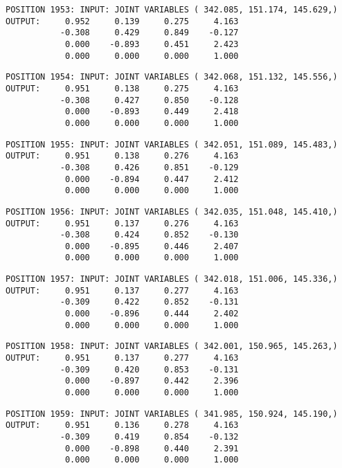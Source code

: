\begin{verbatim}
POSITION 1953: INPUT: JOINT VARIABLES ( 342.085, 151.174, 145.629,)
OUTPUT:     0.952     0.139     0.275     4.163
           -0.308     0.429     0.849    -0.127
            0.000    -0.893     0.451     2.423
            0.000     0.000     0.000     1.000
\end{verbatim} \pagebreak[1]\begin{verbatim}
POSITION 1954: INPUT: JOINT VARIABLES ( 342.068, 151.132, 145.556,)
OUTPUT:     0.951     0.138     0.275     4.163
           -0.308     0.427     0.850    -0.128
            0.000    -0.893     0.449     2.418
            0.000     0.000     0.000     1.000
\end{verbatim} \pagebreak[1]\begin{verbatim}
POSITION 1955: INPUT: JOINT VARIABLES ( 342.051, 151.089, 145.483,)
OUTPUT:     0.951     0.138     0.276     4.163
           -0.308     0.426     0.851    -0.129
            0.000    -0.894     0.447     2.412
            0.000     0.000     0.000     1.000
\end{verbatim} \pagebreak[1]\begin{verbatim}
POSITION 1956: INPUT: JOINT VARIABLES ( 342.035, 151.048, 145.410,)
OUTPUT:     0.951     0.137     0.276     4.163
           -0.308     0.424     0.852    -0.130
            0.000    -0.895     0.446     2.407
            0.000     0.000     0.000     1.000
\end{verbatim} \pagebreak[1]\begin{verbatim}
POSITION 1957: INPUT: JOINT VARIABLES ( 342.018, 151.006, 145.336,)
OUTPUT:     0.951     0.137     0.277     4.163
           -0.309     0.422     0.852    -0.131
            0.000    -0.896     0.444     2.402
            0.000     0.000     0.000     1.000
\end{verbatim} \pagebreak[1]\begin{verbatim}
POSITION 1958: INPUT: JOINT VARIABLES ( 342.001, 150.965, 145.263,)
OUTPUT:     0.951     0.137     0.277     4.163
           -0.309     0.420     0.853    -0.131
            0.000    -0.897     0.442     2.396
            0.000     0.000     0.000     1.000
\end{verbatim} \pagebreak[1]\begin{verbatim}
POSITION 1959: INPUT: JOINT VARIABLES ( 341.985, 150.924, 145.190,)
OUTPUT:     0.951     0.136     0.278     4.163
           -0.309     0.419     0.854    -0.132
            0.000    -0.898     0.440     2.391
            0.000     0.000     0.000     1.000
\end{verbatim} \pagebreak[1]\begin{verbatim}

\end{verbatim}
